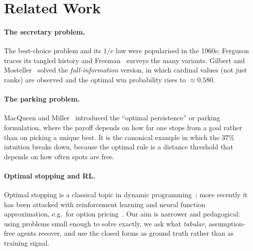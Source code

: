 \section{Related Work}
\paragraph{The secretary problem.} The best-choice problem and its $1/e$ law
were popularised in the 1960s; Ferguson~\cite{ferguson1989solved} traces its
tangled history and Freeman~\cite{freeman1983secretary} surveys the many
variants. Gilbert and Mosteller~\cite{gilbert1966recognizing} solved the
\emph{full-information} version, in which cardinal values (not just ranks) are
observed and the optimal win probability rises to $\approx 0.580$.

\paragraph{The parking problem.} MacQueen and Miller~\cite{macqueen1960optimal}
introduced the ``optimal persistence'' or parking formulation, where the payoff
depends on how far one stops from a goal rather than on picking a unique best.
It is the canonical example in which the $37\%$ intuition breaks down, because
the optimal rule is a distance threshold that depends on how often spots are
free.

\paragraph{Optimal stopping and RL.} Optimal stopping is a classical topic in
dynamic programming~\cite{chow1971great}; more recently it has been attacked
with reinforcement learning and neural function approximation, e.g.\ for
option pricing~\cite{becker2019deep}. Our aim is narrower and pedagogical:
using problems small enough to solve exactly, we ask what \emph{tabular},
assumption-free agents recover, and use the closed forms as ground truth rather
than as training signal.
